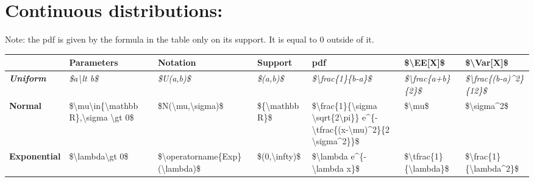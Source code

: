 \documentclass[
]{book}
\theoremstyle{definition}
\theoremstyle{definition}
\theoremstyle{definition}
\theoremstyle{definition}
\theoremstyle{remark}
\begin{document}
\hypertarget{continuous-distributions}{%
\section{Continuous distributions:}\label{continuous-distributions}}

Note: the pdf is given by the formula in the table only on its support. It is equal to \(0\) outside of it.

\begin{tabular}{>{}l|l|l|l|l|l|l}
\hline
 & Parameters & Notation & Support & pdf & \$\textbackslash{}EE[X]\$ & \$\textbackslash{}Var[X]\$\\
\hline
\em{\textbf{Uniform}} & \em{\$a\textbackslash{}lt b\$} & \em{\$U(a,b)\$} & \em{\$(a,b)\$} & \em{\$\textbackslash{}frac\{1\}\{b-a\}\$} & \em{\$\textbackslash{}frac\{a+b\}\{2\}\$} & \em{\$\textbackslash{}frac\{(b-a)\textasciicircum{}2\}\{12\}\$}\\
\hline
\textbf{Normal} & \$\textbackslash{}mu\textbackslash{}in\{\textbackslash{}mathbb R\},\textbackslash{}sigma \textbackslash{}gt 0\$ & \$N(\textbackslash{}mu,\textbackslash{}sigma)\$ & \$\{\textbackslash{}mathbb R\}\$ & \$\textbackslash{}frac\{1\}\{\textbackslash{}sigma \textbackslash{}sqrt\{2\textbackslash{}pi\}\} e\textasciicircum{}\{-\textbackslash{}tfrac\{(x-\textbackslash{}mu)\textasciicircum{}2\}\{2 \textbackslash{}sigma\textasciicircum{}2\}\}\$ & \$\textbackslash{}mu\$ & \$\textbackslash{}sigma\textasciicircum{}2\$\\
\hline
\textbf{Exponential} & \$\textbackslash{}lambda\textbackslash{}gt 0\$ & \$\textbackslash{}operatorname\{Exp\}(\textbackslash{}lambda)\$ & \$(0,\textbackslash{}infty)\$ & \$\textbackslash{}lambda e\textasciicircum{}\{-\textbackslash{}lambda x\}\$ & \$\textbackslash{}tfrac\{1\}\{\textbackslash{}lambda\}\$ & \$\textbackslash{}frac\{1\}\{\textbackslash{}lambda\textasciicircum{}2\}\$\\
\hline
\end{tabular}
\end{document}
